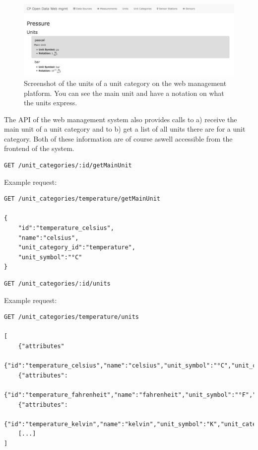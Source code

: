 \begin{figure}
\centering
\includegraphics{images/unit_frontend.png}
\caption{Screenshot of the units of a unit category on the web
management platform. You can see the main unit and have a notation on
what the units express.}
\end{figure}

The API of the web management system also provides calls to a) receive
the main unit of a unit category and to b) get a list of all units there
are for a unit category. Both of these information are of course aswell
accessible from the frontend of the system.

\begin{verbatim}
GET /unit_categories/:id/getMainUnit
\end{verbatim}

Example request:

\begin{verbatim}
GET /unit_categories/temperature/getMainUnit

{
    "id":"temperature_celsius",
    "name":"celsius",
    "unit_category_id":"temperature",
    "unit_symbol":"°C"
}
\end{verbatim}

\begin{verbatim}
GET /unit_categories/:id/units
\end{verbatim}

Example request:

\begin{verbatim}
GET /unit_categories/temperature/units

[
    {"attributes"
        {"id":"temperature_celsius","name":"celsius","unit_symbol":"°C","unit_category_id":"temperature","notation":""}},
    {"attributes":
        {"id":"temperature_fahrenheit","name":"fahrenheit","unit_symbol":"°F","unit_category_id":"temperature","notation":""}},
    {"attributes":
        {"id":"temperature_kelvin","name":"kelvin","unit_symbol":"K","unit_category_id":"temperature","notation":""}}
    [...]
]
\end{verbatim}

